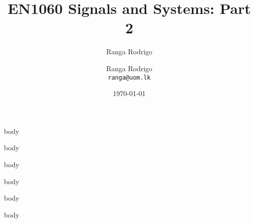 \documentclass[t, aspectratio=169,xcolor={svgnames}, 10pt, handout]{beamer}
\title{EN1060 Signals and Systems: Part 2}
\author{Ranga Rodrigo}
\author[]{Ranga Rodrigo\\ \texttt{ranga@uom.lk}}
\institute[]{The University of Moratuwa, Sri Lanka}
\date{\today}
\begin{document}
    \begin{frame}
        \titlepage
    \end{frame}










    {body}


    {body}

    {body}



    {body}

    {body}

    {body}

\end{document}
